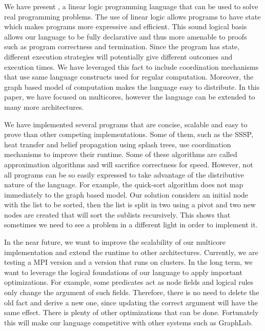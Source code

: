 
We have present \lang, a linear logic programming language that can be used to solve real programming problems.
The use of linear logic allows programs to have state which makes programs more expressive and efficient.
This sound logical basis allows our language to be fully declarative and thus more amenable to proofs such as program correctness and termination.
Since the program has state, different execution strategies will potentially give different outcomes and execution times. We have
leveraged this fact to include coordination mechanisms that use same language constructs used for regular computation.
Moreover, the graph based model of computation makes the language easy to distribute. In this paper, we have
focused on multicores, however the language can be extended to many more architectures.

We have implemented several programs that are concise, scalable and easy to prove than other competing implementations. Some of them, such as
the SSSP, heat transfer and belief propagation using splash trees, use coordination mechanisms to improve their runtime. Some of these algorithms
are called approximation algorithms and will sacrifice correctness for speed. However, not all programs can be so easily expressed
to take advantage of the distributive nature of the language. For example, the quick-sort
algorithm does not map immediately to the graph based model. Our solution considers an initial node with the list to be
sorted, then the list is split in two using a pivot and two new nodes are created that will sort the sublists recursively. This shows that
sometimes we need to see a problem in a different light in order to implement it.

In the near future, we want to improve the scalability of our multicore implementation and extend the runtime to other architectures. Currently,
we are testing a MPI version and a version that runs on clusters. In the long term, we want to leverage the logical foundations of our language
to apply important optimizations. For example, some predicates act as node fields and logical rules only change the argument of such fields.
Therefore, there is no need to delete the old fact and derive a new one, since updating the correct argument will have the same effect.
There is plenty of other optimizations that can be done. Fortunately this will make our language competitive with other systems such as GraphLab.